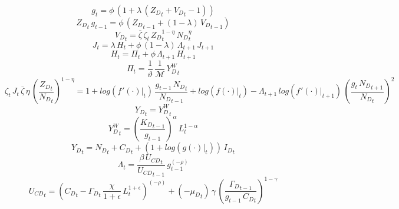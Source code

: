 \documentclass[10pt,a4paper]{article}
\begin{document}
\footnotesize
\begin{dmath}
{g}_{t}=\phi\, \left(1+\lambda\, \left({Z_D}_{t}+{V_D}_{t}-1\right)\right)
\end{dmath}
\begin{dmath}
{Z_D}_{t}\, {g}_{t-1}=\phi\, \left({Z_D}_{t-1}+\left(1-\lambda\right)\, {V_D}_{t-1}\right)
\end{dmath}
\begin{dmath}
{V_D}_{t}=\overline{\zeta}\, {\zeta}_{t}\, {Z_D}_{t}^{1-\eta}\, {N_D}_{t}^{\eta}
\end{dmath}
\begin{dmath}
{J}_{t}=\lambda\, {H}_{t}+\phi\, \left(1-\lambda\right)\, {\Lambda}_{t+1}\, {J}_{t+1}
\end{dmath}
\begin{dmath}
{H}_{t}={\Pi}_{t}+\phi\, {\Lambda}_{t+1}\, {H}_{t+1}
\end{dmath}
\begin{dmath}
{\Pi}_{t}=\frac{1}{\vartheta}\, \frac{1}{\mathcal{M}}\, {Y^W_D}_{t}
\end{dmath}
\begin{dmath}
{\zeta}_{t}\, {J}_{t}\, \overline{\zeta}\, \eta\, \left(\frac{{Z_D}_{t}}{{N_D}_{t}}\right)^{1-\eta}=1+log\left({\left.       f^‎{\prime}\left( \cdot \right)   \right|}_{t}\right)\, \frac{{g}_{t-1}\, {N_D}_{t}}{{N_D}_{t-1}}+log\left({\left.       f\left( \cdot \right)            \right|}_{t}\right)-{\Lambda}_{t+1}\, log\left({\left.       f^‎{\prime}\left( \cdot \right)   \right|}_{t+1}\right)\, \left(\frac{{g}_{t}\, {N_D}_{t+1}}{{N_D}_{t}}\right)^{2}
\end{dmath}
\begin{dmath}
{Y_D}_{t}={Y^W_D}_{t}
\end{dmath}
\begin{dmath}
{Y^W_D}_{t}=\left(\frac{{K_D}_{t-1}}{{g}_{t-1}}\right)^{\alpha}\, {L}_{t}^{1-\alpha}
\end{dmath}
\begin{dmath}
{Y_D}_{t}={N_D}_{t}+{C_D}_{t}+\left(1+log\left({\left.       g\left( \cdot \right)            \right|}_{t}\right)\right)\, {I_D}_{t}
\end{dmath}
\begin{dmath}
{\Lambda}_{t}=\frac{\beta\, {U_{CD}}_{t}}{{U_{CD}}_{t-1}}\, {g}_{t-1}^{\left(-\rho\right)}
\end{dmath}
\begin{dmath}
{U_{CD}}_{t}=\left({C_D}_{t}-{\Gamma_D}_{t}\, \frac{\chi}{1+\epsilon}\, {L}_{t}^{1+\epsilon}\right)^{\left(-\rho\right)}+\left(-{{\mu}_{D}}_{t}\right)\, \gamma\, \left(\frac{{\Gamma_D}_{t-1}}{{g}_{t-1}\, {C_D}_{t}}\right)^{1-\gamma}
\end{dmath}
\end{document}

